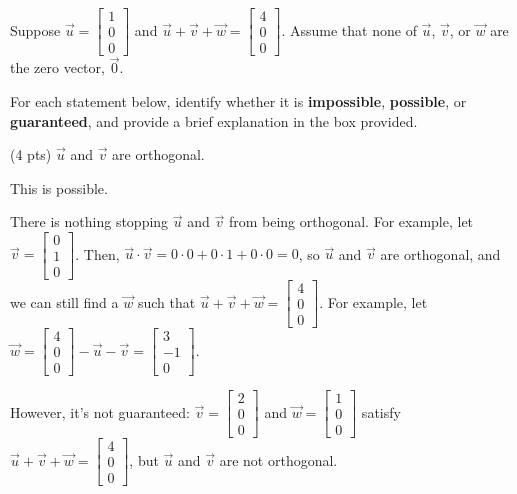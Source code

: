 \documentclass[11pt]{article}
\begin{document}
\newpage

\begin{prob}[(12 pts)]
Suppose $\vec u = \begin{bmatrix} 1 \\ 0 \\ 0 \end{bmatrix}$ and $\vec u + \vec v + \vec w = \begin{bmatrix} 4 \\ 0 \\ 0 \end{bmatrix}$. Assume that none of $\vec u$, $\vec v$, or $\vec w$ are the zero vector, $\vec 0$.

For each statement below, identify whether it is \textbf{impossible}, \textbf{possible}, or \textbf{guaranteed}, and provide a brief explanation in the box provided.

\begin{subprob}(4 pts)
$\vec u$ and $\vec v$ are orthogonal.

  

\emptybox{4.75cm}

\begin{solution}
This is possible.

There is nothing stopping $\vec u$ and $\vec v$ from being orthogonal. For example, let $\vec v = \begin{bmatrix} 0 \\ 1 \\ 0 \end{bmatrix}$. Then, $\vec u \cdot \vec v = 0 \cdot 0 + 0 \cdot 1 + 0 \cdot 0 = 0$, so $\vec u$ and $\vec v$ are orthogonal, and we can still find a $\vec w$ such that $\vec u + \vec v + \vec w = \begin{bmatrix} 4 \\ 0 \\ 0 \end{bmatrix}$. For example, let $\vec w = \begin{bmatrix} 4 \\ 0 \\ 0 \end{bmatrix} - \vec u - \vec v = \begin{bmatrix} 3 \\ -1 \\ 0 \end{bmatrix}$.

However, it's not guaranteed: $\vec v = \begin{bmatrix} 2 \\ 0 \\ 0 \end{bmatrix}$ and $\vec w = \begin{bmatrix} 1 \\ 0 \\ 0 \end{bmatrix}$ satisfy $\vec u + \vec v + \vec w = \begin{bmatrix} 4 \\ 0 \\ 0 \end{bmatrix}$, but $\vec u$ and $\vec v$ are not orthogonal.


\end{solution}
\end{subprob}
\end{prob}
\end{document}
